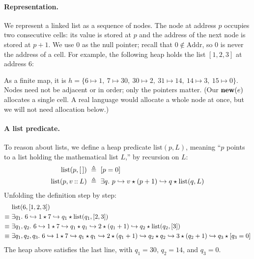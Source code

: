 \paragraph{Representation.} We represent a linked list as a sequence of nodes. The node at address
$p$ occupies two consecutive cells: its value is stored at $p$ and the address of the next node is
stored at $p+1$. We use $0$ as the null pointer; recall that $0\notin\mathrm{Addr}$, so $0$ is
never the address of a cell. For example, the following heap holds the list $[1,2,3]$ at address
$6$:
%
\begin{center}
\end{center}
%
As a finite map, it is $h=\{6\mapsto 1,\ 7\mapsto 30,\ 30\mapsto 2,\ 31\mapsto 14,\ 14\mapsto 3,\ 15\mapsto 0\}$.
Nodes need not be adjacent or in order; only the pointers matter. (Our $\mathbf{new}(e)$ allocates a
single cell. A real language would allocate a whole node at once, but we will not need allocation
below.)
%
\paragraph{A list predicate.} To reason about lists, we define a heap predicate
$\mathrm{list}(p,L)$, meaning ``$p$ points to a list holding the mathematical list $L$,'' by
recursion on $L$:
\begin{align*}
  \mathrm{list}(p,[\,])&\ \triangleq\ [p=0]\\
  \mathrm{list}(p,v\mathbin{::} L)&\ \triangleq\ \exists q.\ p\hookrightarrow v\mathbin{\star}(p+1)\hookrightarrow q\mathbin{\star}\mathrm{list}(q,L)
\end{align*}
Unfolding the definition step by step:
\begin{align*}
  &\mathrm{list}(6,[1,2,3])\\
  \equiv\ &\exists q_1.\ 6\hookrightarrow 1\mathbin{\star} 7\hookrightarrow q_1\mathbin{\star}\mathrm{list}(q_1,[2,3])\\
  \equiv\ &\exists q_1,q_2.\ 6\hookrightarrow 1\mathbin{\star} 7\hookrightarrow q_1\mathbin{\star} q_1\hookrightarrow 2\mathbin{\star}(q_1+1)\hookrightarrow q_2\mathbin{\star}\mathrm{list}(q_2,[3])\\
  \equiv\ &\exists q_1,q_2,q_3.\ 6\hookrightarrow 1\mathbin{\star} 7\hookrightarrow q_1\mathbin{\star} q_1\hookrightarrow 2\mathbin{\star}(q_1+1)\hookrightarrow q_2\mathbin{\star} q_2\hookrightarrow 3\mathbin{\star}(q_2+1)\hookrightarrow q_3\mathbin{\star}[q_3=0]
\end{align*}
The heap above satisfies the last line, with $q_1=30$, $q_2=14$, and $q_3=0$.
%
